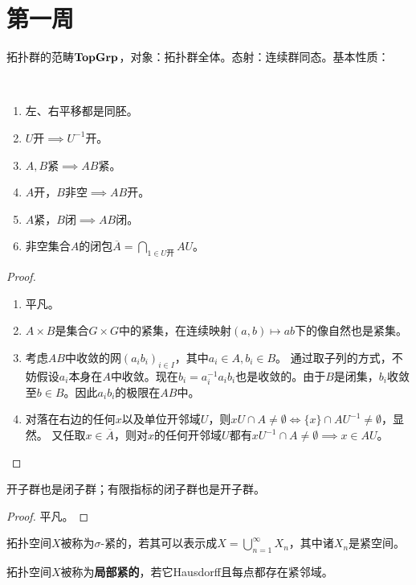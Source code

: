 \section{第一周}
拓扑群的范畴$\mathbf{TopGrp}$，对象：拓扑群全体。态射：连续群同态。基本性质：
\begin{proposition}
    \begin{enumerate}
        \item 左、右平移都是同胚。
        \item $U$开$\implies U^{-1}$开。
        \item $A,B$紧$\implies AB$紧。
        \item $A$开，$B$非空$\implies AB$开。
        \item $A$紧，$B$闭$\implies AB$闭。
        \item 非空集合$A$的闭包$\overline{A} = \bigcap\limits_{1 \in U\text{开}} AU$。
    \end{enumerate}
\end{proposition}
\begin{proof}
    \begin{enumerate}
        \item[1.2.4.]平凡。
        \item[3.]$A \times B$是集合$G \times G$中的紧集，在连续映射$(a,b) \mapsto ab$下的像自然也是紧集。
        \item[5.]考虑$AB$中收敛的网$(a_ib_i)_{i \in I}$，其中$a_i \in A, b_i \in B$。
通过取子列的方式，不妨假设$a_i$本身在$A$中收敛。现在$b_i = a_i^{-1}a_ib_i$也是收敛的。由于$B$是闭集，$b_i$收敛至$b \in B$。因此$a_ib_i$的极限在$AB$中。
\item[6.]对落在右边的任何$x$以及单位开邻域$U$，则$xU \cap A \neq \emptyset \iff \{x\} \cap AU^{-1} \neq \emptyset$，显然。
又任取$x \in \overline{A}$，则对$x$的任何开邻域$U$都有$xU^{-1} \cap A \neq \emptyset \implies x \in AU$。\qedhere
    \end{enumerate}
\end{proof}
\begin{proposition}
    开子群也是闭子群；有限指标的闭子群也是开子群。
\end{proposition}
\begin{proof}
    平凡。
\end{proof}
\begin{definition}
    拓扑空间$X$被称为$\sigma$-紧的，若其可以表示成$X = \bigcup\limits_{n = 1}^\infty X_n$，其中诸$X_n$是紧空间。
\end{definition}
\begin{definition}
    拓扑空间$X$被称为\textbf{局部紧的}，若它Hausdorff且每点都存在紧邻域。
\end{definition}
